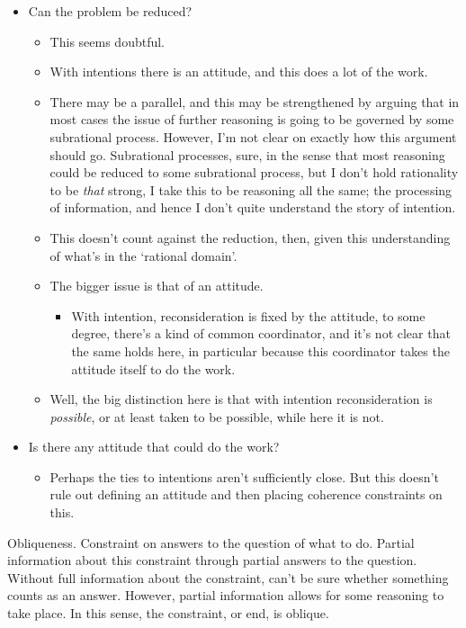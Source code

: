 \documentclass[10pt]{article}
\begin{document}
\begin{itemize}
\item Can the problem be reduced?
  \begin{itemize}
  \item This seems doubtful.
  \item With intentions there is an attitude, and this does a lot of the work.
  \item There may be a parallel, and this may be strengthened by arguing that in most cases the issue of further reasoning is going to be governed by some subrational process.
    However, I'm not clear on exactly how this argument should go.
    Subrational processes, sure, in the sense that most reasoning could be reduced to some subrational process, but I don't hold rationality to be \emph{that} strong, I take this to be reasoning all the same; the processing of information, and hence I don't quite understand the story of intention.
  \item This doesn't count against the reduction, then, given this understanding of what's in the `rational domain'.
  \item The bigger issue is that of an attitude.
    \begin{itemize}
    \item With intention, reconsideration is fixed by the attitude, to some degree, there's a kind of common coordinator, and it's not clear that the same holds here, in particular because this coordinator takes the attitude itself to do the work.
    \end{itemize}
  \item Well, the big distinction here is that with intention reconsideration is \emph{possible}, or at least taken to be possible, while here it is not.
  \end{itemize}
\item Is there any attitude that could do the work?
  \begin{itemize}
  \item Perhaps the ties to intentions aren't sufficiently close.
    But this doesn't rule out defining an attitude and then placing coherence constraints on this.
  \end{itemize}
\end{itemize}




\newpage



Obliqueness.
Constraint on answers to the question of what to do.
Partial information about this constraint through partial answers to the question.
Without full information about the constraint, can't be sure whether something counts as an answer.
However, partial information allows for some reasoning to take place.
In this sense, the constraint, or end, is oblique.
\end{document}
